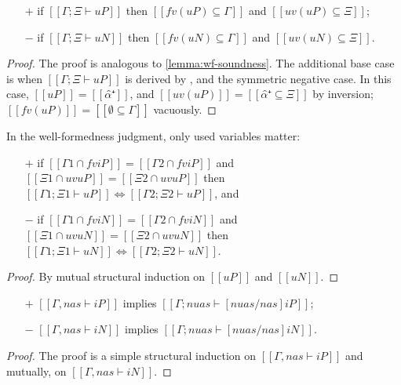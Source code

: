 \begin{lemma}
    \label{lemma:wf-algo-soundness}
    \hfill
  \begin{itemize}
    \item[$+$] if $[[Γ ; Ξ ⊢ uP]]$ then $[[fv(uP) ⊆ Γ]]$ and $[[uv(uP) ⊆ Ξ]]$;
    \item[$-$] if $[[Γ ; Ξ ⊢ uN]]$ then $[[fv(uN) ⊆ Γ]]$ and $[[uv(uN) ⊆ Ξ]]$.
  \end{itemize}
\end{lemma}
\begin{proof}
  The proof is analogous to \cref{lemma:wf-soundness}.
  The additional base case is when $[[Γ ; Ξ ⊢ uP]]$ is derived by ,
  and the symmetric negative case.
  In this case, $[[uP]] = [[α̂⁺]]$, and $[[uv(uP)]] = [[{α̂⁺} ⊆ Ξ]]$ by inversion; $[[fv(uP)]] = [[∅ ⊆ Γ]]$ vacuously.
\end{proof}

\begin{lemma}
  \label{lemma:wf-algo-ctxt-equiv}
  In the well-formedness judgment, only used variables matter:
  \begin{itemize}
  \item[$+$] if $[[Γ1 ∩ fv iP]] = [[Γ2 ∩ fv iP]]$
    and $[[Ξ1 ∩ uv uP]] = [[Ξ2 ∩ uv uP]]$ then
    $[[Γ1 ; Ξ1 ⊢ uP]] \iff [[Γ2 ; Ξ2 ⊢ uP]]$, and
  \item[$-$] if $[[Γ1 ∩ fv iN]] = [[Γ2 ∩ fv iN]]$
    and $[[Ξ1 ∩ uv uN]] = [[Ξ2 ∩ uv uN]]$ then
    $[[Γ1 ; Ξ1 ⊢ uN]] \iff [[Γ2 ; Ξ2 ⊢ uN]]$.
  \end{itemize}
\end{lemma}
\begin{proof}
  By mutual structural induction on $[[uP]]$ and $[[uN]]$.
\end{proof}

\begin{lemma}
  \hfill
  \begin{itemize}
    \item[$+$]  $[[Γ, nas ⊢ iP]]$ implies $[[Γ; {nuas} ⊢ [nuas/nas]iP]]$;
    \item[$-$]  $[[Γ, nas ⊢ iN]]$ implies $[[Γ; {nuas} ⊢ [nuas/nas]iN]]$.
  \end{itemize}
\end{lemma}
\begin{proof}
  The proof is a simple structural induction on $[[Γ, nas ⊢ iP]]$ and mutually, on $[[Γ, nas ⊢ iN]]$.
\end{proof}


